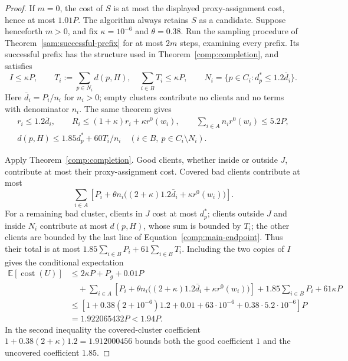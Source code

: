 \begin{proof}
If $m=0$, the cost of $S$ is at most the displayed proxy-assignment
cost, hence at most $1.01P$.  The algorithm always retains $S$ as a
candidate.  Suppose henceforth $m>0$, and fix
$\kappa=10^{-6}$ and $\theta=0.38$.  Run the sampling procedure of
Theorem~\ref{sam:successful-prefix} for at most $2m$ steps, examining
every prefix.  Its successful prefix has the structure used in
Theorem~\ref{comp:completion}, and satisfies
\[
 I\le\kappa P,\qquad
 T_i:=\sum_{p\in N_i}d(p,H),\quad
 \sum_{i\in B}T_i\le\kappa P,
 \qquad N_i=\{p\in C_i:d_p^*\le1.2\bar d_i\}.
\]
Here $\bar d_i=P_i/n_i$ for $n_i>0$; empty clusters contribute no
clients and no terms with denominator $n_i$.  The same theorem gives
\begin{equation}
 \begin{gathered}
 r_i\le1.2\bar d_i,\qquad
 R_i\le(1+\kappa)r_i+\kappa r^0(w_i),\qquad
 \sum_{i\in A}n_i r^0(w_i)\le5.2P,\\
 d(p,H)\le1.85d_p^*+60T_i/n_i
       \quad(i\in B,\ p\in C_i\setminus N_i).
 \end{gathered}
 \label{comp:main-endpoint}
\end{equation}

Apply Theorem~\ref{comp:completion}.  Good clients, whether inside or
outside $J$, contribute at most their proxy-assignment cost.  Covered
bad clients contribute at most
\[
 \sum_{i\in A}\left[P_i+
   \theta n_i\bigl((2+\kappa)1.2\bar d_i+\kappa r^0(w_i)\bigr)\right].
\]
For a remaining bad cluster, clients in $J$ cost at most $d_p^*$;
clients outside $J$ and inside $N_i$ contribute at most $d(p,H)$,
whose sum is bounded by $T_i$; the other clients are bounded by the
last line of Equation~\eqref{comp:main-endpoint}.  Thus their total is
at most $1.85\sum_{i\in B}P_i+61\sum_{i\in B}T_i$.
Including the two copies of $I$ gives the conditional expectation
\[
 \begin{split}
 \mathbb E[\operatorname{cost}(U)]
 &\le 2\kappa P+P_g+0.01P\\
 &\quad+\sum_{i\in A}\left[P_i+
   \theta n_i\bigl((2+\kappa)1.2\bar d_i+\kappa r^0(w_i)\bigr)\right]
       +1.85\sum_{i\in B}P_i+61\kappa P\\
 &\le\left[1+0.38(2+10^{-6})1.2+0.01
                 +63\cdot10^{-6}+0.38\cdot5.2\cdot10^{-6}\right]P\\
 &=1.922065432P<1.94P.
 \end{split}
\]
In the second inequality the covered-cluster coefficient
$1+0.38(2+\kappa)1.2=1.912000456$ bounds both the good coefficient
$1$ and the uncovered coefficient $1.85$.


\end{proof}
